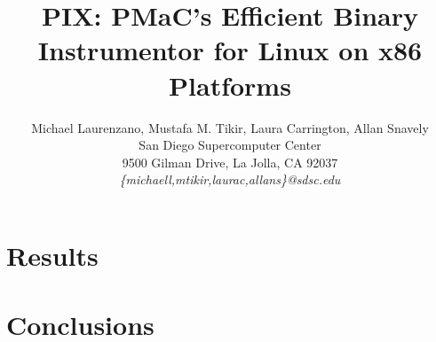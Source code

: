 \documentclass[a4paper,11pt,leqno,notitlepage,onecolumn]{article}
\begin{document}
\title{PIX: PMaC's Efficient Binary Instrumentor for Linux on x86 Platforms}
\author{Michael Laurenzano, Mustafa M. Tikir, Laura Carrington, Allan Snavely\\
San Diego Supercomputer Center\\
9500 Gilman Drive, La Jolla, CA 92037\\
\it{\{michaell,mtikir,laurac,allans\}@sdsc.edu}}
\date{}
\maketitle

\begin{abstract}

\end{abstract}

\label{Section:Introduction}


\label{Section:Overview}


\label{Section:Efficiency}


\label{Section:Results}
\section{Results}
%

\label{Section:Future}


\label{Section:Conclusions}
\section{Conclusions}
%



\end{document}
